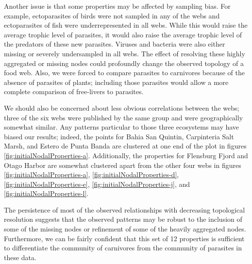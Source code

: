 \documentclass[../dissertation.tex]{subfiles}
\begin{document}
Another issue is that some properties may be affected by sampling bias. For
example, ectoparasites of birds were not sampled in any of the webs and 
ectoparasites of fish were underrepresented in all webs.
While this would raise the average trophic level of parasites, it would also
raise the average trophic level of the predators of these new parasites.
Viruses and bacteria were also either missing or severely undersampled in all
webs. The effect of resolving these highly aggregated or missing nodes could
profoundly change the observed topology of a food web. Also, we were forced
to compare parasites to carnivores because of the absence of parasites of
plants; including those parasites would allow a more complete comparison of
free-livers to parasites.

We should also be concerned about less obvious correlations between the webs;
three of the six webs were published by the same group and were geographically
somewhat similar. Any patterns particular to those three ecosystems may have
biased our results; indeed, the points for Bahia San Quintin, Carpinteria Salt
Marsh, and Estero de Punta Banda are clustered at one end of the plot in
figures \ref{fig:initialNodalProperties-a}. Additionally, the properties for
Flensburg Fjord and Otago Harbor are somewhat clustered apart from the other
four webs in figures \ref{fig:initialNodalProperties-a},
\ref{fig:initialNodalProperties-d}, \ref{fig:initialNodalProperties-e},
\ref{fig:initialNodalProperties-j}, and \ref{fig:initialNodalProperties-l}.


The persistence of most of the observed relationships with decreasing
topological resolution suggests that the observed patterns may be robust to the
inclusion of some of the missing nodes or refinement of some of the heavily
aggregated nodes. Furthermore, we can be fairly confident that this set of 12
properties is sufficient to differentiate the community of carnivores from the
community of parasites in these data.
\end{document}
